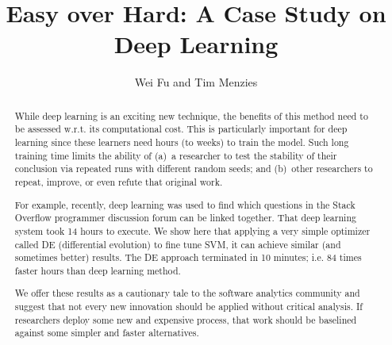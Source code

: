 \documentclass[sigconf]{acmart}
\theoremstyle{break}
\begin{document}
 
\title{Easy over Hard: A Case Study on Deep Learning}


\author{Wei Fu and Tim Menzies}

 
\begin{abstract}
While deep learning is an exciting new technique, the benefits of this
method need to be  assessed w.r.t. its computational cost. 
This is particularly important for deep learning since these learners need 
 hours (to  weeks) to train the model.
Such long training time limits the ability
of (a)~a researcher to test
the stability of their conclusion
via repeated runs with different random seeds;
and (b)~other researchers to repeat, improve, or even refute that original work.

For example, recently, deep learning
was used to  find which
questions  in the Stack Overflow programmer discussion
forum can be linked together. That deep learning system
took 14 hours to execute.
We show here that applying a very simple optimizer called DE (differential evolution) to fine tune SVM, it can achieve  similar (and sometimes better) results. The DE approach  terminated in 10 minutes;
i.e. 84 times faster 
hours than  deep learning method.

We offer these results as a cautionary tale to the software analytics community and suggest that not
every new innovation should be applied without critical analysis. If researchers deploy some new and expensive process, that work should be baselined against some simpler and faster alternatives.

\end{abstract}
\end{document}

